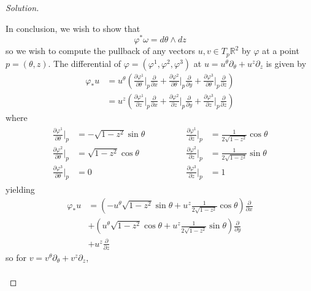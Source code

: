 \begin{proof}[Solution]
\begin{enumerate}[label=\alph*.]
			In conclusion, we wish to show that
			\[\varphi^*\omega=d\theta\wedge dz\]
			so we wish to compute the pullback of any vectors $u,v\in T_p\mathbb{R}^{2}$ by $\varphi$ at a point $p=(\theta,z)$. The differential of $\varphi =(\varphi^1,\varphi^2,\varphi^3)$ at $u=u^\theta\partial_\theta+u^z\partial_z$ is given by
			\begin{align*}
				\varphi_*u& =u^\theta\left( \frac{\partial \varphi^1}{\partial \theta}\Big|_{p}\frac{\partial}{\partial x}+ \frac{\partial\varphi^2}{\partial \theta}\Big|_{p}\frac{\partial}{\partial y}+\frac{\partial \varphi^3}{\partial \theta}\Big|_{p}\frac{\partial}{\partial z} \right) \\
				&=u^z\left( \frac{\partial \varphi^1}{\partial z}\Big|_{p}\frac{\partial}{\partial x}+ \frac{\partial\varphi^2}{\partial z}\Big|_{p}\frac{\partial}{\partial y}+\frac{\partial \varphi^3}{\partial z}\Big|_{p}\frac{\partial}{\partial z} \right)
			\end{align*}
			where
			\begin{align*}
				\begin{aligned}
				\frac{\partial \varphi^1}{\partial \theta}\Big|_{p}& =-\sqrt{1-z^2} \sin \theta\\
				\frac{\partial \varphi^2}{\partial \theta}\Big|_{p}& =\sqrt{1-z^2} \cos  \theta\\
				\frac{\partial \varphi^3}{\partial \theta}\Big|_{p}& =0
			\end{aligned}
			\qquad \qquad 
			\begin{aligned}
				\frac{\partial \varphi^1}{\partial z}\Big|_{p}& =\frac{1}{2\sqrt{1-z^2}}\cos  \theta\\
				\frac{\partial \varphi^2}{\partial z}\Big|_{p}& =\frac{1}{2\sqrt{1-z^2}} \sin   \theta\\
				\frac{\partial \varphi^3}{\partial z}\Big|_{p}& =1
			\end{aligned}
			\end{align*}
			yielding
			\begin{align*}
				\varphi_*u&=\left( -u^\theta \sqrt{1-z^2} \sin \theta+u^z\frac{1}{2\sqrt{1-z^2} }\cos \theta \right) \frac{\partial}{\partial x}\\
				& +\left( u^\theta \sqrt{1-z^2} \cos \theta+u^z\frac{1}{2\sqrt{1-z^2} }\sin \theta \right) \frac{\partial}{\partial y}\\
				&+u^z\frac{\partial}{\partial z} 
			\end{align*}
			so for $v=v^\theta\partial_\theta+v^z\partial_z$,
			\begin{align*}

\end{align*}
\end{enumerate}
\end{proof}
